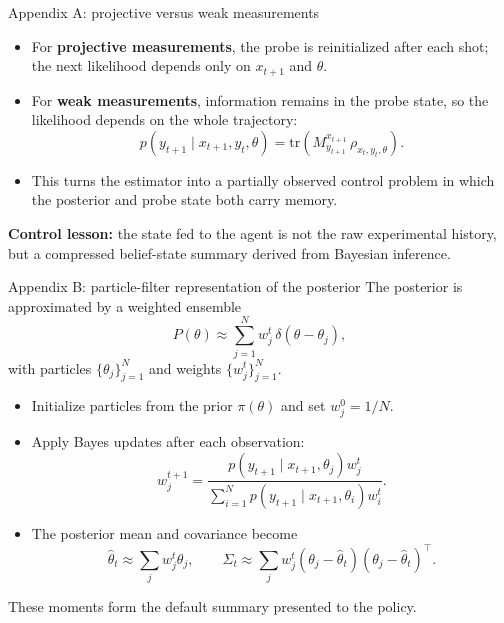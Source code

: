 \documentclass[aspectratio=169]{beamer}
\begin{document}
\begin{frame}{Appendix A: projective versus weak measurements}
\begin{itemize}
  \item For \textbf{projective measurements}, the probe is reinitialized after each shot; the next likelihood depends only on $x_{t+1}$ and $\theta$.
  \item For \textbf{weak measurements}, information remains in the probe state, so the likelihood depends on the whole trajectory:
  \[
    p(y_{t+1}\mid x_{t+1},y_t,\theta)=\mathrm{tr}\!\left(M^{x_{t+1}}_{y_{t+1}}\,\rho_{x_t,y_t,\theta}\right).
  \]
  \item This turns the estimator into a partially observed control problem in which the posterior and probe state both carry memory.
\end{itemize}
\vspace{0.6em}
\textbf{Control lesson:} the state fed to the agent is not the raw experimental history, but a compressed belief-state summary derived from Bayesian inference.
\end{frame}

\begin{frame}{Appendix B: particle-filter representation of the posterior}
The posterior is approximated by a weighted ensemble
\[
  P(\theta)\approx\sum_{j=1}^N w_j^t\,\delta(\theta-\theta_j),
\]
with particles $\{\theta_j\}_{j=1}^N$ and weights $\{w_j^t\}_{j=1}^N$.
\vspace{0.4em}
\begin{itemize}
  \item Initialize particles from the prior $\pi(\theta)$ and set $w_j^0=1/N$.
  \item Apply Bayes updates after each observation:
  \[
    w_j^{t+1}=\frac{p(y_{t+1}\mid x_{t+1},\theta_j)w_j^t}{\sum_{i=1}^N p(y_{t+1}\mid x_{t+1},\theta_i)w_i^t}.
  \]
  \item The posterior mean and covariance become
  \[
    \hat\theta_t\approx\sum_j w_j^t\theta_j,
    \qquad
    \Sigma_t\approx\sum_j w_j^t(\theta_j-\hat\theta_t)(\theta_j-\hat\theta_t)^\top.
  \]
\end{itemize}
These moments form the default summary presented to the policy.
\end{frame}
\end{document}
